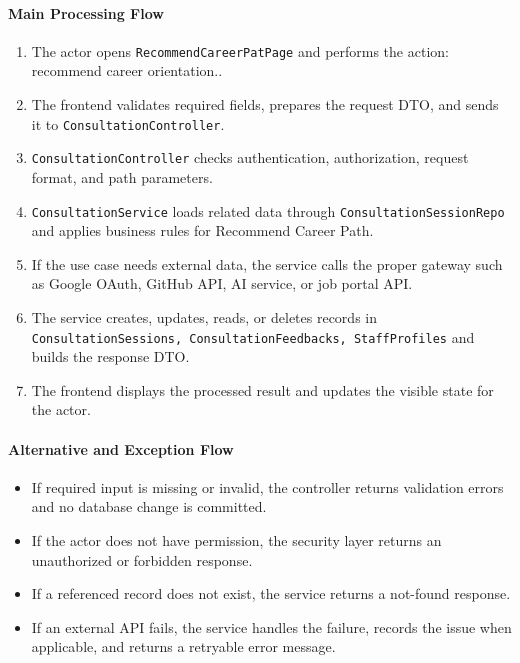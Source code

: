 \paragraph{Main Processing Flow}

\begin{enumerate}
    \item The actor opens \texttt{RecommendCareerPatPage} and performs the action: recommend career orientation..
    \item The frontend validates required fields, prepares the request DTO, and sends it to \texttt{ConsultationController}.
    \item \texttt{ConsultationController} checks authentication, authorization, request format, and path parameters.
    \item \texttt{ConsultationService} loads related data through \texttt{ConsultationSessionRepo} and applies business rules for Recommend Career Path.
    \item If the use case needs external data, the service calls the proper gateway such as Google OAuth, GitHub API, AI service, or job portal API.
    \item The service creates, updates, reads, or deletes records in \texttt{ConsultationSessions, ConsultationFeedbacks, StaffProfiles} and builds the response DTO.
    \item The frontend displays the processed result and updates the visible state for the actor.
\end{enumerate}

\paragraph{Alternative and Exception Flow}

\begin{itemize}
    \item If required input is missing or invalid, the controller returns validation errors and no database change is committed.
    \item If the actor does not have permission, the security layer returns an unauthorized or forbidden response.
    \item If a referenced record does not exist, the service returns a not-found response.
    \item If an external API fails, the service handles the failure, records the issue when applicable, and returns a retryable error message.
\end{itemize}

